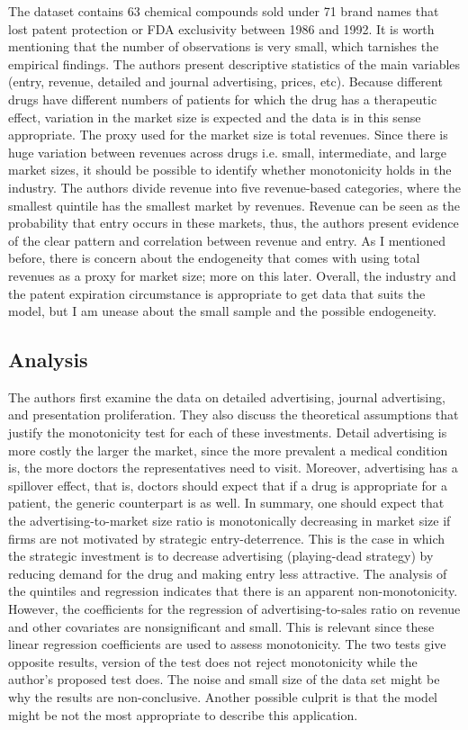 \documentclass{article}
\theoremstyle{definition}
\begin{document}
The dataset contains 63 chemical compounds sold under 71 brand names that lost patent protection or FDA exclusivity between 1986 and 1992. It is worth mentioning that the number of observations is very small, which tarnishes the empirical findings. The authors present descriptive statistics of the main variables (entry, revenue, detailed and journal advertising, prices, etc). Because different drugs have different numbers of patients for which the drug has a therapeutic effect, variation in the market size is expected and the data is in this sense appropriate. The proxy used for the market size is total revenues. Since there is huge variation between revenues across drugs i.e. small, intermediate, and large market sizes, it should be possible to identify whether monotonicity holds in the industry.   The authors divide revenue into five revenue-based categories,  where the smallest quintile has the smallest market by revenues. Revenue can be seen as the probability that entry occurs in these markets, thus, the authors present evidence of the clear pattern and correlation between revenue and entry. As I mentioned before, there is concern about the endogeneity that comes with using total revenues as a proxy for market size; more on this later. Overall, the industry and the patent expiration circumstance is appropriate to get data that suits the model, but I am unease about the small sample and the possible endogeneity.



\subsection*{Analysis}

The authors first examine the data on detailed advertising, journal advertising, and presentation proliferation. They also discuss the theoretical assumptions that justify the monotonicity test for each of these investments. Detail advertising is more costly the larger the market, since the more prevalent a medical condition is, the more doctors the representatives need to visit. Moreover, advertising has a spillover effect, that is, doctors should expect that if a drug is appropriate for a patient, the generic counterpart is as well. In summary, one should expect that the advertising-to-market size ratio is monotonically decreasing in market size if firms are not motivated by strategic entry-deterrence. This is the case in which the strategic investment is to decrease advertising (playing-dead strategy) by reducing demand for the drug and making entry less attractive. The analysis of the quintiles and regression indicates that there is an apparent non-monotonicity. However, the coefficients for the regression of advertising-to-sales ratio on revenue and other covariates are nonsignificant and small. This is relevant since these linear regression coefficients are used to assess monotonicity. The two tests give opposite results,  \cite{hall2000testing} version of the test does not reject monotonicity while the author's proposed test does. The noise and small size of the data set might be why the results are non-conclusive. Another possible culprit is that the model might be not the most appropriate to describe this application. 
\end{document}
